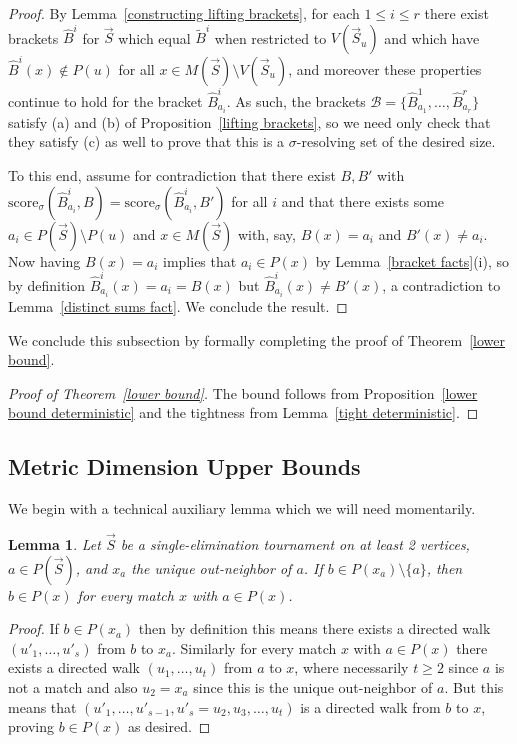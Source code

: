 \documentclass[12pt,letterpaper]{article}
\newtheorem{lem}[thm]{Lemma}
\theoremstyle{definition}
\newcommand{\sig}{\sigma}
\renewcommand{\1}{\mathbbm{1}}
\newcommand{\sm}{\setminus}
\renewcommand{\c}[1]{\mathcal{#1}}
\newcommand{\score}{\mathrm{score}}
\newcommand{\tour}{\vec{S}}
\begin{document}
\begin{proof}
	
	By Lemma~\ref{constructing lifting brackets}, for each $1\le i\le r$ there exist brackets $\widehat{B}^i$ for $\tour$ which equal $\widetilde{B}^i$ when restricted to $V(\tour_u)$ and which have $\widehat{B}^i(x)\notin P(u)$ for all $x\in M(\tour)\sm V(\tour_u)$, and moreover these properties continue to hold for the bracket $\widehat{B}_{a_i}^i$.  As such, the brackets  $\c{B}=\{\widehat{B}_{a_1}^1,\ldots,\widehat{B}_{a_r}^r\}$ satisfy (a) and (b) of Proposition~\ref{lifting brackets}, so we need only check that they satisfy (c) as well to prove that this is a $\sig$-resolving set of the desired size.
	
	To this end, assume for contradiction that there exist $B,B'$ with $\score_\sig(\widehat{B}^i_{a_i},B)=\score_\sig(\widehat{B}_{a_i}^i,B')$ for all $i$ and that there exists some $a_i\in P(\tour)\sm P(u)$ and $x\in M(\tour)$ with, say, $B(x)=a_i$ and $B'(x)\ne a_i$.  Now having $B(x)=a_i$ implies that $a_i\in P(x)$ by Lemma~\ref{bracket facts}(i), so by definition $\widehat{B}_{a_i}^i(x)=a_i=B(x)$ but $\widehat{B}_{a_i}^i(x)\ne B'(x)$, a contradiction to Lemma~\ref{distinct sums fact}.  We conclude the result.
\end{proof}

We conclude this subsection by formally completing the proof of Theorem~\ref{lower bound}.

\begin{proof}[Proof of Theorem~\ref{lower bound}]
	The bound follows from Proposition~\ref{lower bound deterministic} and the tightness from Lemma~\ref{tight deterministic}.
\end{proof}



\subsection{Metric Dimension Upper Bounds}
We begin with a technical auxiliary lemma which we will need momentarily.
\begin{lem}\label{a implies b}
	Let $\tour$ be a single-elimination tournament on at least 2 vertices, $a\in P(\tour)$, and $x_a$ the unique out-neighbor of $a$.  If $b\in P(x_a)\sm \{a\}$, then $b\in P(x)$ for every match $x$ with $a\in P(x)$.
\end{lem}
\begin{proof}
	If $b\in P(x_a)$ then by definition this means there exists a directed walk $(u'_1,\ldots,u'_s)$ from $b$ to $x_a$.  Similarly for every match $x$ with $a\in P(x)$ there exists a directed walk $(u_1,\ldots,u_t)$ from $a$ to $x$, where necessarily $t\ge 2$ since $a$ is not a match and also $u_2=x_a$ since this is the unique out-neighbor of $a$.  But this means that $(u'_1,\ldots,u'_{s-1},u'_s=u_2,u_3,\ldots,u_t)$ is a directed walk from $b$ to $x$, proving $b\in P(x)$ as desired.
\end{proof}
\end{document}
